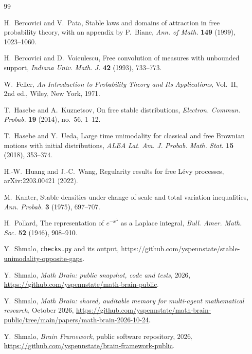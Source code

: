 \documentclass[11pt]{amsart}
\theoremstyle{definition}
\theoremstyle{remark}
\numberwithin{equation}{section}
\begin{document}
\begin{thebibliography}{99}

 H.~Bercovici and V.~Pata, Stable laws and domains of attraction in free probability theory, with an appendix by P.~Biane, \emph{Ann. of Math.} \textbf{149} (1999), 1023--1060.

 H.~Bercovici and D.~Voiculescu, Free convolution of measures with unbounded support, \emph{Indiana Univ. Math. J.} \textbf{42} (1993), 733--773.

 W.~Feller, \emph{An Introduction to Probability Theory and Its Applications}, Vol.~II, 2nd ed., Wiley, New York, 1971.

 T.~Hasebe and A.~Kuznetsov, On free stable distributions, \emph{Electron. Commun. Probab.} \textbf{19} (2014), no.~56, 1--12.

 T.~Hasebe and Y.~Ueda, Large time unimodality for classical and free Brownian motions with initial distributions, \emph{ALEA Lat. Am. J. Probab. Math. Stat.} \textbf{15} (2018), 353--374.

 H.-W.~Huang and J.-C.~Wang, Regularity results for free L\'evy processes, arXiv:2203.00421 (2022).

 M.~Kanter, Stable densities under change of scale and total variation inequalities, \emph{Ann. Probab.} \textbf{3} (1975), 697--707.

 H.~Pollard, The representation of $e^{-x^\lambda}$ as a Laplace integral, \emph{Bull. Amer. Math. Soc.} \textbf{52} (1946), 908--910.

 Y.~Shmalo, \texttt{checks.py} and its output, \url{https://github.com/yspennstate/stable-unimodality-opposite-gaps}.

 Y.~Shmalo, \emph{Math Brain: public snapshot, code and tests}, 2026, \url{https://github.com/yspennstate/math-brain-public}.

 Y.~Shmalo, \emph{Math Brain: shared, auditable memory for multi-agent mathematical research}, October 2026, \url{https://github.com/yspennstate/math-brain-public/tree/main/papers/math-brain-2026-10-24}.

 Y.~Shmalo, \emph{Brain Framework}, public software repository, 2026, \url{https://github.com/yspennstate/brain-framework-public}.

\end{thebibliography}
\end{document}
